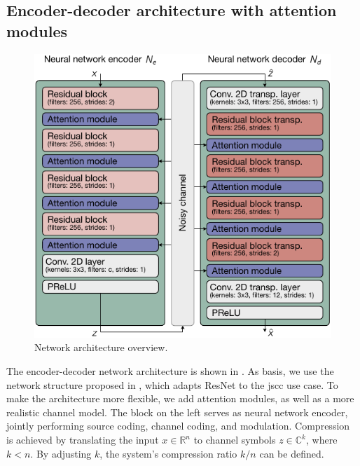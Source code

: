 \documentclass[conference]{IEEEtran}
\begin{document}
\subsection{Encoder-decoder architecture with attention modules}

\begin{figure}
  \includegraphics[width=\linewidth]{figures/network-architecture}

  \caption{Network architecture overview.}
  \label{fig:architecture-overview}
\end{figure}

The encoder-decoder network architecture is shown in .
As basis, we use the network structure proposed in \cite{satjscc}, which adapts ResNet \cite{resnet} to the \ac{jscc} use case.
To make the architecture more flexible, we add attention modules, as well as a more realistic channel model.
The block on the left serves as neural network encoder, jointly performing source coding, channel coding, and modulation.
Compression is achieved by translating the input $x \in \mathbb{R}^n$ to channel symbols $z \in \mathbb{C}^k$, where $k < n$.
By adjusting $k$, the system's compression ratio $k/n$ can be defined.
\end{document}
